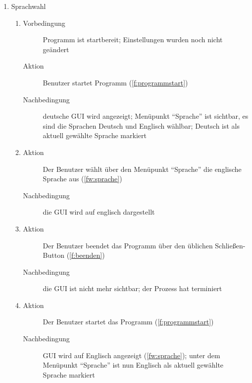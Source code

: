 \begin{enumerate} [label=\bfseries /TSW \arabic*0/, leftmargin=*]
	\item Sprachwahl \label{ts:sprachwahl}
	\begin{enumerate}[leftmargin=0pt]
		\item
		\begin{description}
			\item[Vorbedingung] Programm ist startbereit; Einstellungen wurden noch nicht geändert
			\item[Aktion] Benutzer startet Programm (\ref{f:programmstart})
			\item[Nachbedingung] deutsche GUI wird angezeigt; Menüpunkt \enquote{Sprache} ist sichtbar, es sind die Sprachen Deutsch und Englisch wählbar; Deutsch ist als aktuell gewählte Sprache markiert
		\end{description}
		\item
		\begin{description}
			\item[Aktion] Der Benutzer wählt über den Menüpunkt \enquote{Sprache} die englische Sprache aus (\ref{fw:sprache})
			\item[Nachbedingung] die GUI wird auf englisch dargestellt
		\end{description}
		\item
		\begin{description}
			\item[Aktion] Der Benutzer beendet das Programm über den üblichen Schließen-Button (\ref{f:beenden})
			\item[Nachbedingung] die GUI ist nicht mehr sichtbar; der Prozess hat terminiert
		\end{description}
		\item
		\begin{description}
			\item[Aktion] Der Benutzer startet das Programm (\ref{f:programmstart})
			\item[Nachbedingung] GUI wird auf Englisch angezeigt (\ref{fw:sprache}); unter dem Menüpunkt \enquote{Sprache} ist nun Englisch als aktuell gewählte Sprache markiert
		\end{description}
	\end{enumerate}


\end{enumerate}
